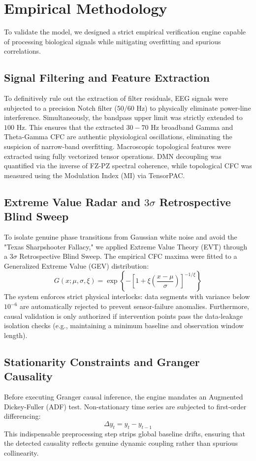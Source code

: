 \documentclass[10pt,twocolumn,letterpaper]{article}
\begin{document}
\section{Empirical Methodology}
To validate the model, we designed a strict empirical verification engine capable of processing biological signals while mitigating overfitting and spurious correlations.

\subsection{Signal Filtering and Feature Extraction}
To definitively rule out the extraction of filter residuals, EEG signals were subjected to a precision Notch filter ($50/60$ Hz) to physically eliminate power-line interference. Simultaneously, the bandpass upper limit was strictly extended to $100$ Hz. This ensures that the extracted $30-70$ Hz broadband Gamma and Theta-Gamma CFC are authentic physiological oscillations, eliminating the suspicion of narrow-band overfitting. Macroscopic topological features were extracted using fully vectorized tensor operations. DMN decoupling was quantified via the inverse of FZ-PZ spectral coherence, while topological CFC was measured using the Modulation Index (MI) via TensorPAC.

\subsection{Extreme Value Radar and $3\sigma$ Retrospective Blind Sweep}
To isolate genuine phase transitions from Gaussian white noise and avoid the "Texas Sharpshooter Fallacy," we applied Extreme Value Theory (EVT) through a $3\sigma$ Retrospective Blind Sweep. The empirical CFC maxima were fitted to a Generalized Extreme Value (GEV) distribution:
\begin{equation}
G(x; \mu, \sigma, \xi) = \exp\left\{ -\left[ 1 + \xi \left( \frac{x - \mu}{\sigma} \right) \right]^{-1/\xi} \right\}
\end{equation}
The system enforces strict physical interlocks: data segments with variance below $10^{-6}$ are automatically rejected to prevent sensor-failure anomalies. Furthermore, causal validation is only authorized if intervention points pass the data-leakage isolation checks (e.g., maintaining a minimum baseline and observation window length).

\subsection{Stationarity Constraints and Granger Causality}
Before executing Granger causal inference, the engine mandates an Augmented Dickey-Fuller (ADF) test. Non-stationary time series are subjected to first-order differencing:
\begin{equation}
\Delta y_t = y_t - y_{t-1}
\end{equation}
This indispensable preprocessing step strips global baseline drifts, ensuring that the detected causality reflects genuine dynamic coupling rather than spurious collinearity.
\end{document}

